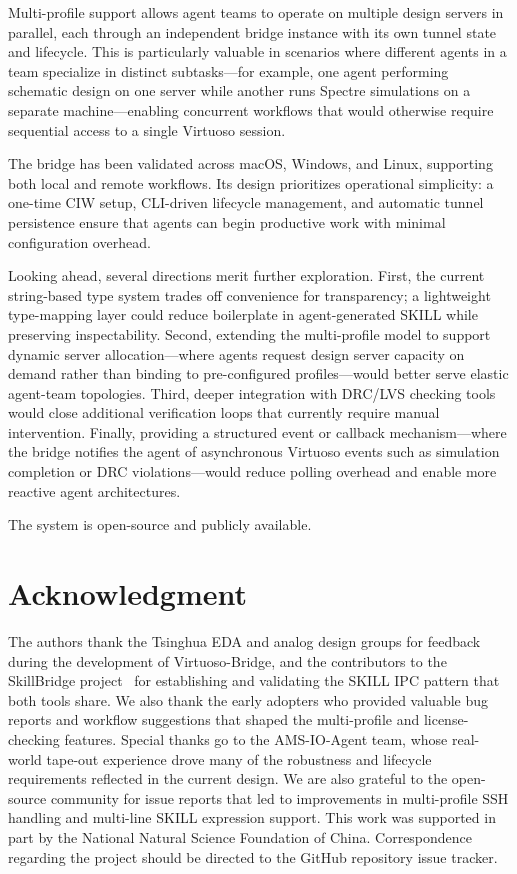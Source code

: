 \documentclass[lettersize,journal]{ieee_template/IEEEtran}
\begin{document}
Multi-profile support allows agent teams to operate on multiple design servers in parallel, each through an independent bridge instance with its own tunnel state and lifecycle. This is particularly valuable in scenarios where different agents in a team specialize in distinct subtasks---for example, one agent performing schematic design on one server while another runs Spectre simulations on a separate machine---enabling concurrent workflows that would otherwise require sequential access to a single Virtuoso session.

The bridge has been validated across macOS, Windows, and Linux, supporting both local and remote workflows. Its design prioritizes operational simplicity: a one-time CIW setup, CLI-driven lifecycle management, and automatic tunnel persistence ensure that agents can begin productive work with minimal configuration overhead.

Looking ahead, several directions merit further exploration. First, the current string-based type system trades off convenience for transparency; a lightweight type-mapping layer could reduce boilerplate in agent-generated SKILL while preserving inspectability. Second, extending the multi-profile model to support dynamic server allocation---where agents request design server capacity on demand rather than binding to pre-configured profiles---would better serve elastic agent-team topologies. Third, deeper integration with DRC/LVS checking tools would close additional verification loops that currently require manual intervention. Finally, providing a structured event or callback mechanism---where the bridge notifies the agent of asynchronous Virtuoso events such as simulation completion or DRC violations---would reduce polling overhead and enable more reactive agent architectures.

The system is open-source and publicly available.

\section*{Acknowledgment}

The authors thank the Tsinghua EDA and analog design groups for feedback during the development of Virtuoso-Bridge, and the contributors to the SkillBridge project~\cite{skillbridge} for establishing and validating the SKILL IPC pattern that both tools share. We also thank the early adopters who provided valuable bug reports and workflow suggestions that shaped the multi-profile and license-checking features. Special thanks go to the AMS-IO-Agent team, whose real-world tape-out experience drove many of the robustness and lifecycle requirements reflected in the current design. We are also grateful to the open-source community for issue reports that led to improvements in multi-profile SSH handling and multi-line SKILL expression support. This work was supported in part by the National Natural Science Foundation of China. Correspondence regarding the project should be directed to the GitHub repository issue tracker.
\end{document}
